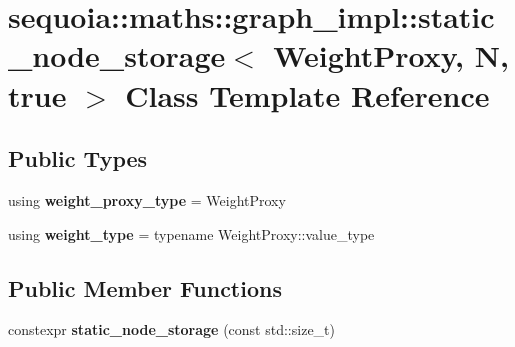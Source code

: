 \hypertarget{classsequoia_1_1maths_1_1graph__impl_1_1static__node__storage_3_01_weight_proxy_00_01_n_00_01true_01_4}{}\section{sequoia\+::maths\+::graph\+\_\+impl\+::static\+\_\+node\+\_\+storage$<$ Weight\+Proxy, N, true $>$ Class Template Reference}
\label{classsequoia_1_1maths_1_1graph__impl_1_1static__node__storage_3_01_weight_proxy_00_01_n_00_01true_01_4}
\subsection*{Public Types}
\begin{DoxyCompactItemize}
\item 
\mbox{\label{classsequoia_1_1maths_1_1graph__impl_1_1static__node__storage_3_01_weight_proxy_00_01_n_00_01true_01_4_a40fffeacd88d77a7d715c93465043937}} 
using {\bfseries weight\+\_\+proxy\+\_\+type} = Weight\+Proxy
\item 
\mbox{\label{classsequoia_1_1maths_1_1graph__impl_1_1static__node__storage_3_01_weight_proxy_00_01_n_00_01true_01_4_ae9ca887ed9bc492238a8b9fb48dfa33a}} 
using {\bfseries weight\+\_\+type} = typename Weight\+Proxy\+::value\+\_\+type
\end{DoxyCompactItemize}
\subsection*{Public Member Functions}
\begin{DoxyCompactItemize}
\item 
\mbox{\label{classsequoia_1_1maths_1_1graph__impl_1_1static__node__storage_3_01_weight_proxy_00_01_n_00_01true_01_4_a57f12de666b077ce7440268a1f5c9279}} 
constexpr {\bfseries static\+\_\+node\+\_\+storage} (const std\+::size\+\_\+t)
\end{DoxyCompactItemize}

